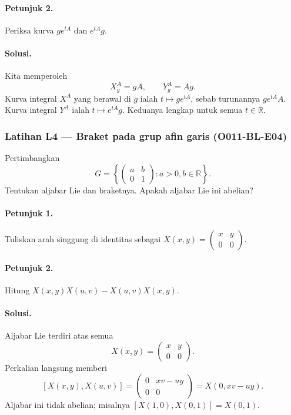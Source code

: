 \paragraph{Petunjuk 2.}
Periksa kurva $g e^{tA}$ dan $e^{tA}g$.

\paragraph{Solusi.}
Kita memperoleh
\[
  X^A_g=gA,
  \qquad Y^A_g=Ag.
\]
Kurva integral $X^A$ yang berawal di $g$ ialah $t\mapsto ge^{tA}$, sebab
turunannya $ge^{tA}A$. Kurva integral $Y^A$ ialah
$t\mapsto e^{tA}g$. Keduanya lengkap untuk semua $t\in\mathbb R$.

\subsubsection*{Latihan L4 — Braket pada grup afin garis (O011-BL-E04)}
\label{o011-bl-e04}

Pertimbangkan
\[
 G=\left\{\begin{pmatrix}a&b\\0&1\end{pmatrix}:a>0,
 b\in\mathbb R\right\}.
\]
Tentukan aljabar Lie dan braketnya. Apakah aljabar Lie ini abelian?

\paragraph{Petunjuk 1.}
Tuliskan arah singgung di identitas sebagai
$X(x,y)=\left(\begin{smallmatrix}x&y\\0&0\end{smallmatrix}\right)$.

\paragraph{Petunjuk 2.}
Hitung $X(x,y)X(u,v)-X(u,v)X(x,y)$.

\paragraph{Solusi.}
Aljabar Lie terdiri atas semua
\[
 X(x,y)=\begin{pmatrix}x&y\\0&0\end{pmatrix}.
\]
Perkalian langsung memberi
\[
 [X(x,y),X(u,v)]
 =\begin{pmatrix}0&xv-uy\\0&0\end{pmatrix}
 =X(0,xv-uy).
\]
Aljabar ini tidak abelian; misalnya
$[X(1,0),X(0,1)]=X(0,1)$.

